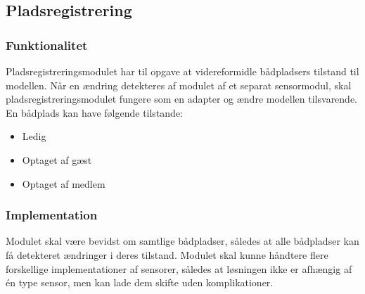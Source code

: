 \subsection{Pladsregistrering}
\label{sub:plads_registrering}

\subsubsection{Funktionalitet}
\label{ssub:plads_registrering_funktionalitet}

Pladsregistreringsmodulet har til opgave at videreformidle bådpladsers tilstand til modellen. Når en ændring detekteres af modulet af et separat sensormodul, skal pladsregistreringsmodulet fungere som en adapter og ændre modellen tilsvarende. En bådplads kan have følgende tilstande:

\begin{itemize}
  \item Ledig
  \item Optaget af gæst
  \item Optaget af medlem
\end{itemize}



\subsubsection{Implementation}
\label{ssub:plads_registrering_implementation}

Modulet skal være bevidst om samtlige bådpladser, således at alle bådpladser kan få detekteret ændringer i deres tilstand. 
Modulet skal kunne håndtere flere forskellige implementationer af sensorer, således at løsningen ikke er afhængig af én type sensor, men kan lade dem skifte uden komplikationer.
